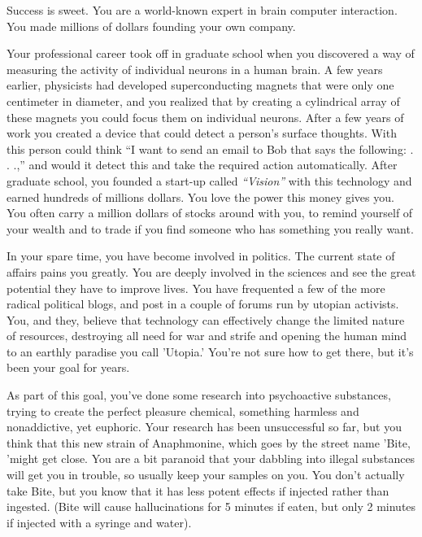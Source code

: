 \documentclass[char]{guildcamp1}
\begin{document}
\name{\cRival{}}


Success is sweet.  You are a world-known expert in brain computer interaction.  You made millions of dollars founding your own company.  

Your professional career took off in graduate school when you discovered a way of measuring the activity of individual neurons in a human brain.  A few years earlier, physicists had developed superconducting magnets that were only one centimeter in diameter, and you realized that by creating a cylindrical array of these magnets you could focus them on individual neurons.  After a few years of work you created a device that could detect a person's surface thoughts. With this person could think ``I want to send an email to Bob that says the following: . . .,'' and would it detect this and take the required action automatically.  After graduate school, you founded a start-up called {\em ``Vision''} with this technology and earned hundreds of  millions dollars.  You love the power this money gives you.  You often carry a million dollars of stocks around with you, to remind yourself of your wealth and to trade if you find someone who has something you really want.

In your spare time, you have become involved in politics.  The current state of affairs pains you greatly.  You are deeply involved in the sciences and see the great potential they have to improve lives. You have frequented a few of the more radical political blogs, and post in a couple of forums run by utopian activists. You, and they, believe that technology can effectively change the limited nature of resources, destroying all need for war and strife and opening the human mind to an earthly paradise you call 'Utopia.' You're not sure how to get there, but it's been your goal for years.

As part of this goal, you've done some research into psychoactive substances, trying to create the perfect pleasure chemical, something harmless and nonaddictive, yet euphoric. Your research has been unsuccessful so far, but you think that this new strain of Anaphmonine, which goes by the street name 'Bite, 'might get close. You are a bit paranoid that your dabbling into illegal substances will get you in trouble, so usually keep your samples on you. You don't actually take Bite, but you know that it has less potent effects if injected rather than ingested. (Bite will cause hallucinations for 5 minutes if eaten, but only 2 minutes if injected with a syringe and water).
\end{document}
